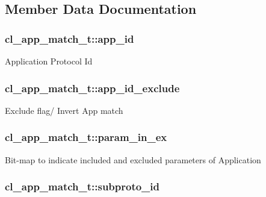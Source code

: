 \subsection{Member Data Documentation}
\hypertarget{structcl__app__match__t_ab514d0ca0def2e9a568e3007d0fb91c7}{
\subsubsection[{app\-\_\-id}]{ cl\-\_\-app\-\_\-match\-\_\-t\-::app\-\_\-id}}\label{structcl__app__match__t_ab514d0ca0def2e9a568e3007d0fb91c7}
Application Protocol Id \hypertarget{structcl__app__match__t_a72a78aa05541db433b06bb5128a11ca7}{
\subsubsection[{app\-\_\-id\-\_\-exclude}]{ cl\-\_\-app\-\_\-match\-\_\-t\-::app\-\_\-id\-\_\-exclude}}\label{structcl__app__match__t_a72a78aa05541db433b06bb5128a11ca7}
Exclude flag/ Invert App match \hypertarget{structcl__app__match__t_a5084baee848246640f5affd79c04da3e}{
\subsubsection[{param\-\_\-in\-\_\-ex}]{ cl\-\_\-app\-\_\-match\-\_\-t\-::param\-\_\-in\-\_\-ex}}\label{structcl__app__match__t_a5084baee848246640f5affd79c04da3e}
Bit-\/map to indicate included and excluded parameters of Application \hypertarget{structcl__app__match__t_a8847ab7f98f9790cae0ff81b77ccae83}{
\subsubsection[{subproto\-\_\-id}]{ cl\-\_\-app\-\_\-match\-\_\-t\-::subproto\-\_\-id}}\label{structcl__app__match__t_a8847ab7f98f9790cae0ff81b77ccae83}
